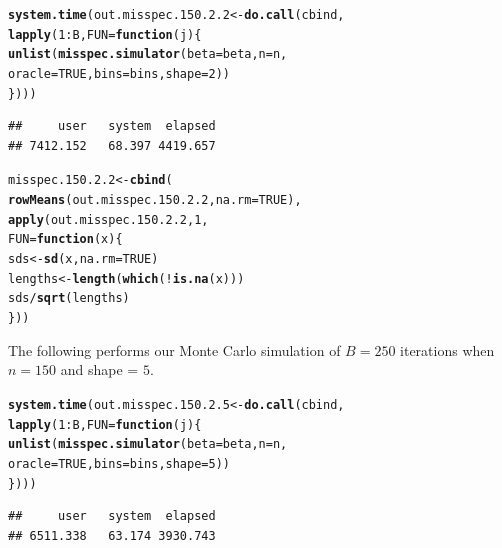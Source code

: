 \documentclass[11pt]{article}\usepackage[]{graphicx}\usepackage[]{color}
\makeatletter
\newcommand{\hlnum}[1]{\textcolor[rgb]{0.686,0.059,0.569}{#1}}%
\newcommand{\hlopt}[1]{\textcolor[rgb]{0,0,0}{#1}}%
\newcommand{\hlstd}[1]{\textcolor[rgb]{0.345,0.345,0.345}{#1}}%
\newcommand{\hlkwa}[1]{\textcolor[rgb]{0.161,0.373,0.58}{\textbf{#1}}}%
\newcommand{\hlkwb}[1]{\textcolor[rgb]{0.69,0.353,0.396}{#1}}%
\newcommand{\hlkwc}[1]{\textcolor[rgb]{0.333,0.667,0.333}{#1}}%
\newcommand{\hlkwd}[1]{\textcolor[rgb]{0.737,0.353,0.396}{\textbf{#1}}}%
\newenvironment{kframe}{%
 \def\at@end@of@kframe{}%
 \ifinner\ifhmode%
  \def\at@end@of@kframe{\end{minipage}}%
  \begin{minipage}{\columnwidth}%
 \fi\fi%
 \def\FrameCommand##1{\hskip\@totalleftmargin \hskip-\fboxsep
 \colorbox{shadecolor}{##1}\hskip-\fboxsep
     \hskip-\linewidth \hskip-\@totalleftmargin \hskip\columnwidth}%
 \MakeFramed {\advance\hsize-\width
   \@totalleftmargin\z@ \linewidth\hsize
   \@setminipage}}%
 {\par\unskip\endMakeFramed%
 \at@end@of@kframe}
\newenvironment{knitrout}{}{} %
\makeatother
\begin{document}
\begin{knitrout}
\color{fgcolor}\begin{kframe}
\begin{alltt}
\hlkwd{system.time}\hlstd{(out.misspec.150.2.2} \hlkwb{<-} \hlkwd{do.call}\hlstd{(cbind,}
  \hlkwd{lapply}\hlstd{(}\hlnum{1}\hlopt{:}\hlstd{B,} \hlkwc{FUN} \hlstd{=} \hlkwa{function}\hlstd{(}\hlkwc{j}\hlstd{)\{}
    \hlkwd{unlist}\hlstd{(}\hlkwd{misspec.simulator}\hlstd{(}\hlkwc{beta} \hlstd{= beta,} \hlkwc{n} \hlstd{= n,}
      \hlkwc{oracle} \hlstd{=} \hlnum{TRUE}\hlstd{,} \hlkwc{bins} \hlstd{= bins,} \hlkwc{shape} \hlstd{=} \hlnum{2}\hlstd{))}
\hlstd{\})))}
\end{alltt}
\begin{verbatim}
##     user   system  elapsed 
## 7412.152   68.397 4419.657
\end{verbatim}
\end{kframe}
\end{knitrout}

\begin{knitrout}
\color{fgcolor}\begin{kframe}
\begin{alltt}
\hlstd{misspec.150.2.2} \hlkwb{<-} \hlkwd{cbind}\hlstd{(}
  \hlkwd{rowMeans}\hlstd{(out.misspec.150.2.2,} \hlkwc{na.rm} \hlstd{=} \hlnum{TRUE}\hlstd{),}
  \hlkwd{apply}\hlstd{(out.misspec.150.2.2,} \hlnum{1}\hlstd{,}
  \hlkwc{FUN} \hlstd{=} \hlkwa{function}\hlstd{(}\hlkwc{x}\hlstd{)\{}
    \hlstd{sds} \hlkwb{<-} \hlkwd{sd}\hlstd{(x,} \hlkwc{na.rm} \hlstd{=} \hlnum{TRUE}\hlstd{)}
    \hlstd{lengths} \hlkwb{<-} \hlkwd{length}\hlstd{(}\hlkwd{which}\hlstd{(}\hlopt{!}\hlkwd{is.na}\hlstd{(x)))}
    \hlstd{sds} \hlopt{/} \hlkwd{sqrt}\hlstd{(lengths)}
  \hlstd{\}))}
\end{alltt}
\end{kframe}
\end{knitrout}

The following performs our Monte Carlo simulation of $B = 250$ iterations 
when $n = 150$ and shape = $5$.

\begin{knitrout}
\color{fgcolor}\begin{kframe}
\begin{alltt}
\hlkwd{system.time}\hlstd{(out.misspec.150.2.5} \hlkwb{<-} \hlkwd{do.call}\hlstd{(cbind,}
  \hlkwd{lapply}\hlstd{(}\hlnum{1}\hlopt{:}\hlstd{B,} \hlkwc{FUN} \hlstd{=} \hlkwa{function}\hlstd{(}\hlkwc{j}\hlstd{)\{}
    \hlkwd{unlist}\hlstd{(}\hlkwd{misspec.simulator}\hlstd{(}\hlkwc{beta} \hlstd{= beta,} \hlkwc{n} \hlstd{= n,}
      \hlkwc{oracle} \hlstd{=} \hlnum{TRUE}\hlstd{,} \hlkwc{bins} \hlstd{= bins,} \hlkwc{shape} \hlstd{=} \hlnum{5}\hlstd{))}
\hlstd{\})))}
\end{alltt}
\begin{verbatim}
##     user   system  elapsed 
## 6511.338   63.174 3930.743
\end{verbatim}
\end{kframe}
\end{knitrout}
\end{document}

